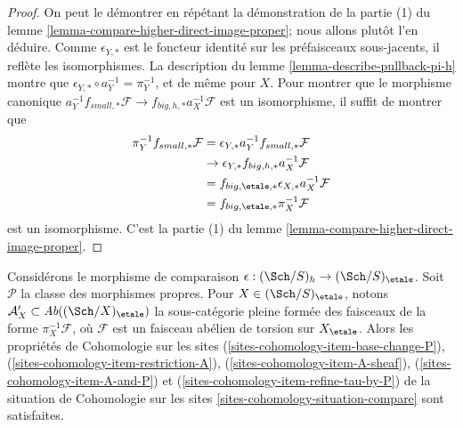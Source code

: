 \begin{proof}
On peut le démontrer en répétant la démonstration de la
partie (1) du lemme \ref{lemma-compare-higher-direct-image-proper};
nous allons plutôt l'en déduire.
Comme $\epsilon_{Y, *}$ est le foncteur identité sur les préfaisceaux sous-jacents,
il reflète les isomorphismes. La description
du lemme \ref{lemma-describe-pullback-pi-h}
montre que $\epsilon_{Y, *} \circ a_Y^{-1} = \pi_Y^{-1}$,
et de même pour $X$. Pour montrer que le morphisme canonique
$a_Y^{-1}f_{small, *}\mathcal{F} \to f_{big, h, *}a_X^{-1}\mathcal{F}$
est un isomorphisme, il suffit de montrer que
\begin{align*}
\pi_Y^{-1}f_{small, *}\mathcal{F}
& =
\epsilon_{Y, *}a_Y^{-1}f_{small, *}\mathcal{F} \\
& \to 
\epsilon_{Y, *}f_{big, h, *}a_X^{-1}\mathcal{F} \\
& =
f_{big, \etale, *} \epsilon_{X, *}a_X^{-1}\mathcal{F} \\
& =
f_{big, \etale, *}\pi_X^{-1}\mathcal{F}
\end{align*}
est un isomorphisme. C'est la partie
(1) du lemme \ref{lemma-compare-higher-direct-image-proper}.
\end{proof}

\begin{lemma}
\label{lemma-compare-h-etale}
Considérons le morphisme de comparaison $\epsilon : (\Sch/S)_h \to (\Sch/S)_\etale$.
Soit $\mathcal{P}$ la classe des morphismes propres.
Pour $X \in (\Sch/S)_\etale$, notons
$\mathcal{A}'_X \subset \textit{Ab}((\Sch/X)_\etale)$
la sous-catégorie pleine formée des faisceaux de la forme
$\pi_X^{-1}\mathcal{F}$, où $\mathcal{F}$ est un
faisceau abélien de torsion sur $X_\etale$.
Alors les propriétés de Cohomologie sur les sites
(\ref{sites-cohomology-item-base-change-P}),
(\ref{sites-cohomology-item-restriction-A}),
(\ref{sites-cohomology-item-A-sheaf}),
(\ref{sites-cohomology-item-A-and-P}) et
(\ref{sites-cohomology-item-refine-tau-by-P})
de la situation de Cohomologie sur les sites
\ref{sites-cohomology-situation-compare} sont satisfaites.
\end{lemma}

